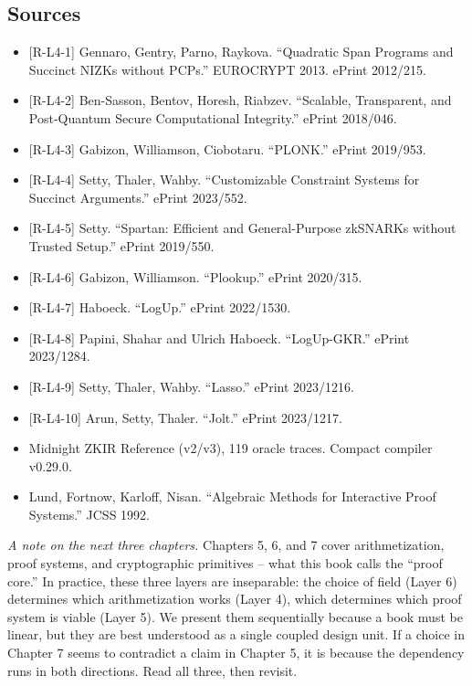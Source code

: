 \documentclass[
  11pt,
  openany]{report}
\providecommand{\tightlist}{%
  \setlength{\itemsep}{0pt}\setlength{\parskip}{0pt}}
\begin{document}
\subsection{Sources}\label{sources}

\begin{itemize}
\tightlist
\item
  {[}R-L4-1{]} Gennaro, Gentry, Parno, Raykova. ``Quadratic Span Programs and
  Succinct NIZKs without PCPs.'' EUROCRYPT 2013. ePrint 2012/215.
\item
  {[}R-L4-2{]} Ben-Sasson, Bentov, Horesh, Riabzev. ``Scalable, Transparent, and
  Post-Quantum Secure Computational Integrity.'' ePrint 2018/046.
\item
  {[}R-L4-3{]} Gabizon, Williamson, Ciobotaru. ``PLONK.'' ePrint 2019/953.
\item
  {[}R-L4-4{]} Setty, Thaler, Wahby. ``Customizable Constraint Systems for
  Succinct Arguments.'' ePrint 2023/552.
\item
  {[}R-L4-5{]} Setty. ``Spartan: Efficient and General-Purpose zkSNARKs without
  Trusted Setup.'' ePrint 2019/550.
\item
  {[}R-L4-6{]} Gabizon, Williamson. ``Plookup.'' ePrint 2020/315.
\item
  {[}R-L4-7{]} Haboeck. ``LogUp.'' ePrint 2022/1530.
\item
  {[}R-L4-8{]} Papini, Shahar and Ulrich Haboeck. ``LogUp-GKR.'' ePrint
  2023/1284.
\item
  {[}R-L4-9{]} Setty, Thaler, Wahby. ``Lasso.'' ePrint 2023/1216.
\item
  {[}R-L4-10{]} Arun, Setty, Thaler. ``Jolt.'' ePrint 2023/1217.
\item
  Midnight ZKIR Reference (v2/v3), 119 oracle traces. Compact compiler v0.29.0.
\item
  Lund, Fortnow, Karloff, Nisan. ``Algebraic Methods for Interactive Proof
  Systems.'' JCSS 1992.
\end{itemize}

\par\vspace{18pt}

\emph{A note on the next three chapters.} Chapters 5, 6, and 7 cover
arithmetization, proof systems, and cryptographic primitives -- what this book
calls the ``proof core.'' In practice, these three layers are inseparable: the
choice of field (Layer 6) determines which arithmetization works (Layer 4),
which determines which proof system is viable (Layer 5). We present them
sequentially because a book must be linear, but they are best understood as a
single coupled design unit. If a choice in Chapter 7 seems to contradict a claim
in Chapter 5, it is because the dependency runs in both directions. Read all
three, then revisit.
\end{document}
